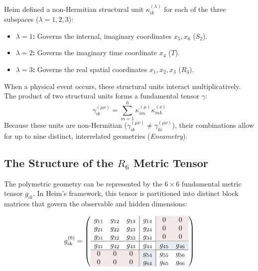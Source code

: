 \documentclass[11pt,a4paper,oneside]{article}
\begin{document}
Heim defined a non-Hermitian structural unit $\kappa_{ik}^{(\lambda)}$ for each of the three subspaces ($\lambda = 1, 2, 3$):
\begin{itemize}
    \item \textbf{$\lambda = 1$:} Governs the internal, imaginary coordinates $x_5, x_6$ ($S_2$).
    \item \textbf{$\lambda = 2$:} Governs the imaginary time coordinate $x_4$ ($T$).
    \item \textbf{$\lambda = 3$:} Governs the real spatial coordinates $x_1, x_2, x_3$ ($R_3$).
\end{itemize}

When a physical event occurs, these structural units interact multiplicatively. The product of two structural units forms a fundamental tensor $\gamma$:
\begin{equation}
    \gamma_{ik}^{(\mu\nu)} = \sum_{m=1}^6 \kappa_{im}^{(\mu)} \kappa_{mk}^{(\nu)}
\end{equation}
Because these units are non-Hermitian ($\gamma_{ik}^{(\mu\nu)} \neq \gamma_{ki}^{(\mu\nu)}$), their combinations allow for up to nine distinct, interrelated geometries (\textit{Eneametry}).
\subsection{The Structure of the \texorpdfstring{$R_6$}{R6} Metric Tensor}

The polymetric geometry can be represented by the $6 \times 6$ fundamental metric tensor $g_{ik}$. In Heim's framework, this tensor is partitioned into distinct block matrices that govern the observable and hidden dimensions:

\begin{equation}
    g_{ik}^{(6)} = \left(
    \begin{array}{ccc|c|cc}
    g_{11} & g_{12} & g_{13} & g_{14} & \cellcolor{theoryred!10}0 & \cellcolor{theoryred!10}0 \\
    g_{21} & g_{22} & g_{23} & g_{24} & \cellcolor{theoryred!10}0 & \cellcolor{theoryred!10}0 \\
    g_{31} & g_{32} & g_{33} & g_{34} & \cellcolor{theoryred!10}0 & \cellcolor{theoryred!10}0 \\ \hline
    g_{41} & g_{42} & g_{43} & g_{44} & \cellcolor{theoryblue!10}g_{45} & \cellcolor{theoryblue!10}g_{46} \\ \hline
    \cellcolor{theoryred!10}0 & \cellcolor{theoryred!10}0 & \cellcolor{theoryred!10}0 & \cellcolor{theoryblue!10}g_{54} & g_{55} & g_{56} \\
    \cellcolor{theoryred!10}0 & \cellcolor{theoryred!10}0 & \cellcolor{theoryred!10}0 & \cellcolor{theoryblue!10}g_{64} & g_{65} & g_{66} \\
    \end{array}
    \right)
\end{equation}
\end{document}
